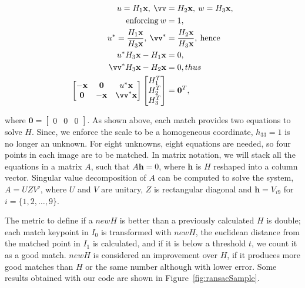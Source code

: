 \documentclass[12pt]{article}
\begin{document}
\begin{equation}
\begin{aligned}
	u = H_1 \mathbf{x}, \: \vv &= H_2 \mathbf{x}, \: w = H_3 \mathbf{x}, \\ 
	\text{enforcing} \: w &= 1, \\
	u^* = \frac{H_1 \mathbf{x}}{ H_3 \mathbf{x}}, \: \vv^* &= \frac{H_2 \mathbf{x}}{ H_3 \mathbf{x}}, \: \text{hence} \\	
	u^*H_3\mathbf{x} - H_1\mathbf{x} &= 0, \\
	\vv^* H_3\mathbf{x} - H_2\mathbf{x} &= 0, thus\\
	\begin{bmatrix}
	-\mathbf{x} & \mathbf{0} & u^*\mathbf{x} \\
	\mathbf{0} & -\mathbf{x} & \vv^*\mathbf{x}
	\end{bmatrix}
	\begin{bmatrix}
	H_1^T \\
	H_2^T \\ 
	H_3^T 
	\end{bmatrix}
	&= \mathbf{0}^T,
\end{aligned}
\label{eq:derivatingH}
\end{equation}

where $\mathbf{0} = \begin{bmatrix} 0 & 0 & 0 \end{bmatrix}$. 
As shown above, each match provides two equations to solve $H$.
Since, we enforce the scale to be a homogeneous coordinate, $h_{33} = 1$ is no longer an unknown.
For eight unknowns, eight equations are needed, so four points in each image are to be matched.
In matrix notation, we will stack all the equations in a matrix $A$, such that $A\mathbf{h}=0$, where $\mathbf{h}$ is $H$ reshaped into a column vector.
Singular value decomposition of $A$ can be computed to solve the system, $A = UZV'$, where $U$ and $V$ are unitary, $Z$ is rectangular diagonal and $\mathbf{h} = V_{i9}$ for $i = \lbrace 1,2, \ldots, 9 \rbrace$.

The metric to define if a $newH$ is better than a previously calculated $H$ is double; each match keypoint in $I_0$ is transformed with $newH$, the euclidean distance from the matched point in $I_1$ is calculated, and if it is below a threshold $t$, we count it as a good match.
$newH$ is considered an improvement over $H$, if it produces more good matches than $H$ or the same number although with lower error.
Some results obtained with our code are shown in Figure~\ref{fig:ransacSample}.
\end{document}
